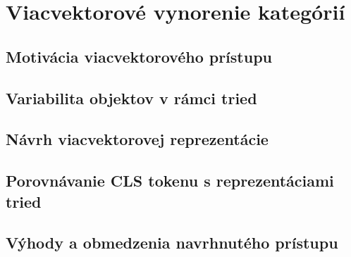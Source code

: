 \chapter{Viacvektorové vynorenie kategórií}

\label{kap:viacvektorove_vynorenie}

\section{Motivácia viacvektorového prístupu}

\section{Variabilita objektov v rámci tried}

\section{Návrh viacvektorovej reprezentácie}

\section{Porovnávanie CLS tokenu s reprezentáciami tried}

\section{Výhody a obmedzenia navrhnutého prístupu}